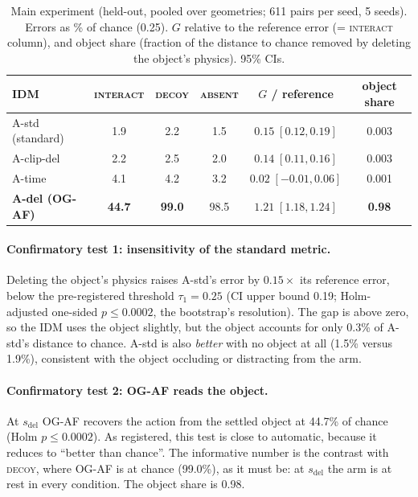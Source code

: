 \documentclass[10pt]{article}
\newcommand{\sdel}{s_{\mathrm{del}}}
\newcommand{\cond}[1]{\textsc{#1}}
\begin{document}
\begin{table}[t]
\centering\small
\caption{Main experiment (held-out, pooled over geometries; 611 pairs per seed, 5
seeds). Errors as \% of chance (0.25). $G$ relative to the reference error
(= \cond{interact} column), and object share (fraction of the distance to chance removed
by deleting the object's physics). 95\% CIs.}
\label{tab:e}
\begin{tabular}{lccccc}
\toprule
IDM & \cond{interact} & \cond{decoy} & \cond{absent} & $G$ / reference & object share \\
\midrule
A-std (standard) & 1.9 & 2.2 & 1.5 & $0.15\;[0.12, 0.19]$ & 0.003 \\
A-clip-del       & 2.2 & 2.5 & 2.0 & $0.14\;[0.11, 0.16]$ & 0.003 \\
A-time           & 4.1 & 4.2 & 3.2 & $0.02\;[-0.01, 0.06]$ & 0.001 \\
\textbf{A-del (OG-AF)} & \textbf{44.7} & \textbf{99.0} & 98.5 & $\mathbf{1.21\;[1.18, 1.24]}$ & \textbf{0.98} \\
\bottomrule
\end{tabular}
\end{table}

\paragraph{Confirmatory test 1: insensitivity of the standard metric.} Deleting the
object's physics raises A-std's error by $0.15\times$ its reference error, below the
pre-registered threshold $\tau_1=0.25$ (CI upper bound 0.19; Holm-adjusted one-sided
$p\leq0.0002$, the bootstrap's resolution). The gap is above zero, so the IDM uses the
object slightly, but the object accounts for only 0.3\% of A-std's distance to chance.
A-std is also \emph{better} with no object at all (1.5\% versus 1.9\%), consistent with
the object occluding or distracting from the arm.

\paragraph{Confirmatory test 2: OG-AF reads the object.} At $\sdel$ OG-AF recovers the
action from the settled object at 44.7\% of chance (Holm $p\leq0.0002$). As registered,
this test is close to automatic, because it reduces to ``better than chance''. The
informative number is the contrast with \cond{decoy}, where OG-AF is at chance (99.0\%),
as it must be: at $\sdel$ the arm is at rest in every condition. The object share is
0.98.
\end{document}
